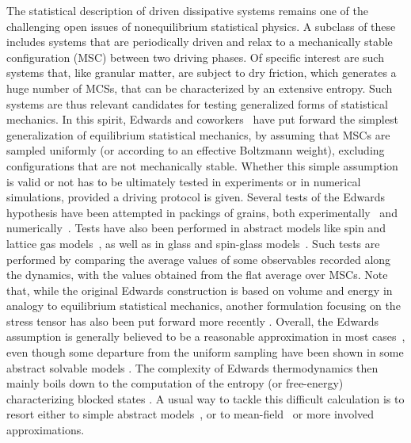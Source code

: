 \documentclass[prl,twocolumn,floats,floatfix,aps,superscriptaddress,showpacs]{revtex4-1}
\begin{document}
The statistical description of driven dissipative systems remains one
of the challenging open issues of nonequilibrium statistical physics.
A subclass of these includes systems that are periodically driven and
relax to a mechanically stable configuration (MSC) between two driving
phases.  Of specific interest are such systems that, like granular
matter, are subject to dry friction, which generates a huge number of
MCSs, that can be characterized by an
extensive entropy.  Such systems are thus relevant candidates for
testing generalized forms of statistical mechanics.  In this spirit,
Edwards and coworkers~\cite{EO89,ME89,EM94,EG98,BKVS00,BHDC15} have put
forward the simplest generalization of equilibrium statistical
mechanics, by assuming that MSCs are
sampled uniformly (or according to an effective Boltzmann weight),
excluding configurations that are not
mechanically stable.  Whether this
simple assumption is valid or not has to be ultimately tested in
experiments or in numerical simulations, provided a driving protocol
is given.  Several tests of the Edwards hypothesis have been attempted
in packings of grains, both
experimentally~\cite{NKBJN98,SGS05,LCDB06,NRRCD09} and
numerically~\cite{KM02,M04,MD05,PCN06,BK15}. Tests have also been
performed in abstract models like spin and lattice gas
models~\cite{BPS00,LD01,L02,BFS02,DGL02,DGL03}, as well as in glass
and spin-glass models~\cite{CN00,BKVS00,BKVS01,DL01,LD03}.  Such tests
are performed by comparing the average values of some observables
recorded along the dynamics, with the values obtained from the flat
average over MSCs.  Note that, while the
original Edwards construction is based on volume and energy in analogy
to equilibrium statistical mechanics, another formulation focusing on
the stress tensor has also been put forward more recently
\cite{HHC07,HC09,BE09,BJE12,BZBC13,Daniels13}.
%
Overall, the Edwards assumption is generally believed to be a
reasonable approximation in most cases~\cite{BHDC15}, even though some
departure from the uniform sampling have been shown in some abstract
solvable models \cite{DGL02,DGL03}.  The complexity of Edwards
thermodynamics then mainly boils down to the computation of the
entropy (or free-energy) characterizing blocked states
\cite{BE03,BE06,BSWM08,WSJM11,APF14}.  A usual way to tackle this
difficult calculation is to resort either to simple abstract
models~\cite{BPS00,LD01,L02,BFS02,DGL02,DGL03}, or to
mean-field~\cite{SL03} or more involved~\cite{BE03} approximations.
\end{document}
